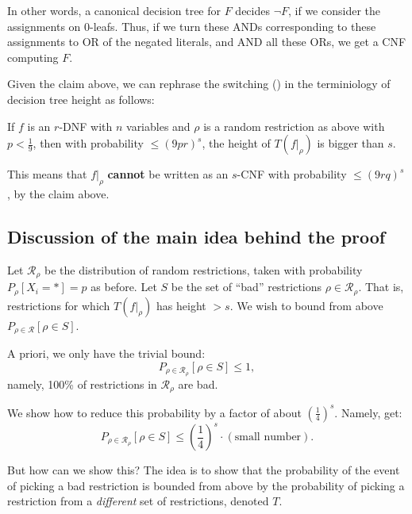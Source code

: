 In other words, a canonical decision tree for \( F \) decides \( \neg F \),
if we consider the assignments on 0-leafs.
Thus, if we turn these ANDs corresponding to these assignments to OR of the negated literals, and AND all these ORs, 
we get a CNF computing \( F \).

Given the  claim above, we can rephrase the switching () in the terminiology of decision tree height as follows: 

\begin{theorem}\label{thm:SL-DT-version}
If \( f \) is an \( r \)-DNF with \( n \) variables 
and \( \rho \) is a random restriction as above with 
\( p < \frac{1}{9} \),
then with probability \( \leq (9pr)^s \), the height of \( T(f|_{\rho}) \) 
is bigger than \( s \).
\end{theorem}

This means that \( f|_{\rho} \) \textbf{cannot} be written as an \( s \)-CNF 
with probability \( \leq (9rq)^s \), by the claim above.

\subsection*{Discussion of the main idea behind the proof}

Let \( \mathcal{R}_{\rho} \) be the distribution of random restrictions, 
taken with probability \( P_{\rho}[X_i = *] = p \) as before.
Let \( S \) be the set of ``bad'' restrictions \( \rho \in \mathcal{R}_{\rho} \).
That is, restrictions for which \( T(f|_{\rho}) \) has height \( > s \).
We wish to bound from above \( P_{\rho\in \mathcal R}[\rho \in S] \).

A priori, we only have the trivial bound:
\[
P_{\rho \in \mathcal{R}_{\rho}}[\rho \in S] \leq 1,
\]
namely, 100\% of restrictions in \( \mathcal{R}_{\rho} \) are bad.

We show how to reduce this probability by a factor of about \( \left( \frac{1}{4} \right)^s \).
Namely, get:
\[
P_{\rho \in \mathcal{R}_{\rho}}[\rho \in S] \leq \left( \frac{1}{4} \right)^s \cdot (\text{small number}).
\]

But how can we show this?
The idea is to show that the probability of the event of picking a bad restriction 
is bounded from above by the probability of picking a restriction from a \emph{different} 
set of restrictions, denoted \( T \).

